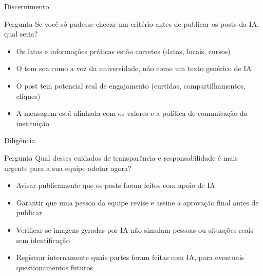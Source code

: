 \documentclass[aspectratio=169,11pt]{beamer}
\begin{document}
\begin{frame}{Discernimento}
  \begin{notebox}{Pergunta}
    \small Se você só pudesse checar um critério antes de publicar os posts da IA, qual seria?
  \end{notebox}
  \vspace{0.3cm}
  \begin{itemize}
    \item[\textbf{\color{terracota}A}] Os fatos e informações práticas estão corretos (datas, locais, cursos)
    \item[\textbf{\color{terracota}B}] O tom soa como a voz da universidade, não como um texto genérico de IA
    \item[\textbf{\color{terracota}C}] O post tem potencial real de engajamento (curtidas, compartilhamentos, cliques)
    \item[\textbf{\color{terracota}D}] A mensagem está alinhada com os valores e a política de comunicação da instituição
  \end{itemize}
\end{frame}

\begin{frame}{Diligência}
  \begin{notebox}{Pergunta}
    \small Qual desses cuidados de transparência e responsabilidade é mais urgente para a sua equipe adotar agora?
  \end{notebox}
  \vspace{0.3cm}
  \begin{itemize}
    \item[\textbf{\color{terracota}A}] Avisar publicamente que os posts foram feitos com apoio de IA
    \item[\textbf{\color{terracota}B}] Garantir que uma pessoa da equipe revise e assine a aprovação final antes de publicar
    \item[\textbf{\color{terracota}C}] Verificar se imagens geradas por IA não simulam pessoas ou situações reais sem identificação
    \item[\textbf{\color{terracota}D}] Registrar internamente quais partes foram feitas com IA, para eventuais questionamentos futuros
  \end{itemize}
\end{frame}

\end{document}
